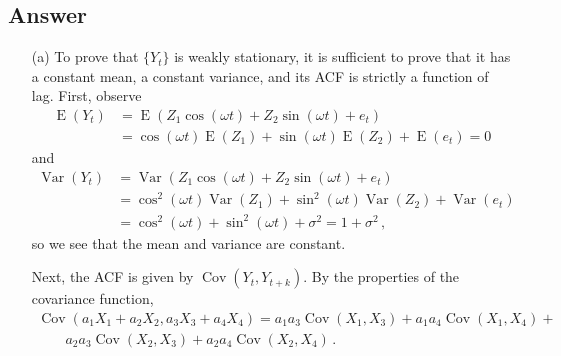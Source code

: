 \documentclass[10pt]{fphw}
\theoremstyle{definition}
\newcommand{\var}{\operatorname{Var}}
\newcommand{\expect}{\operatorname{E}}
\newcommand{\cov}{\operatorname{Cov}}
\begin{document}
\subsection*{Answer}

\begin{enumerate}
\item[(a)] To prove that $\{Y_t\}$ is weakly stationary, it is sufficient to prove that it has a constant mean, a constant variance, and its ACF is strictly a function of lag.
First, observe
\begin{align}
\expect(Y_t) &= \expect(Z_1 \cos(\omega t) + Z_2 \sin(\omega t) + e_t)\\
&= \cos(\omega t) \expect(Z_1) + \sin(\omega t) \expect(Z_2)  + \expect(e_t) = 0
\end{align}
and
\begin{align}
\var(Y_t) &= \var(Z_1 \cos(\omega t) + Z_2 \sin(\omega t) + e_t)\\
&= \cos^2(\omega t) \var(Z_1) + \sin^2(\omega t) \var(Z_2)  + \var(e_t)\\
&= \cos^2(\omega t) + \sin^2(\omega t) + \sigma^2 = 1+\sigma^2\,,
\end{align}
so we see that the mean and variance are constant.

Next, the ACF is given by $\cov(Y_t,Y_{t+k})$. By the properties of the covariance function,
\begin{equation}
\label{eq:cov_prop}
\begin{split}
\cov(a_1 X_1 + a_2 X_2, a_3 X_3 + a_4 X_4) = a_1 a_3 \cov(X_1,X_3) + a_1 a_4 \cov(X_1,X_4) + \\
\qquad a_2 a_3 \cov(X_2,X_3) + a_2 a_4 \cov(X_2, X_4)\,.
\end{split}
\end{equation}


\end{enumerate}
\end{document}
